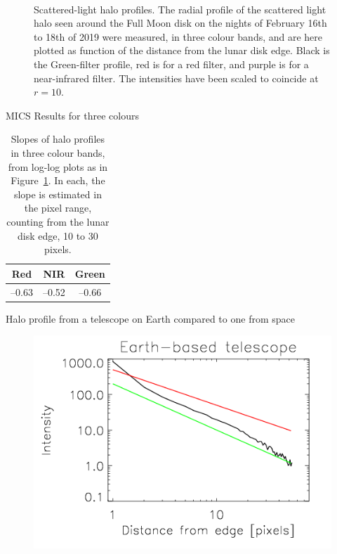 \documentclass[final,hyperref={pdfpagelabels=false}]{beamer}
\begin{document}
\begin{frame}[t]
\begin{columns}[t]
\begin{column}{.23\textwidth}
\begin{block}{}
\begin{figure}
\caption{Scattered-light halo profiles. The radial profile of the scattered light halo seen around the Full Moon disk on the nights of February 16th to 18th of 2019 were measured, in three colour bands, and are here plotted as function of the distance from the lunar disk edge. Black is the Green-filter profile, red is for a red filter, and purple is for a near-infrared filter. The intensities have been scaled to coincide at $r=10$.}~\label{fig:3panelfig}
\end{figure}
\end{block}

\begin{block}{MICS Results for three colours}
\begin{table}[]
    \centering
    \begin{tabular}{ccc}
    Red & NIR & Green \\
    \hline
         --0.63 & --0.52 & --0.66\\
         \hline
    \end{tabular}
    \caption{Slopes of halo profiles in three colour bands, from log-log plots as in Figure~\ref{fig:3panelfig}. In each, the slope is estimated in the pixel range, counting from the lunar disk edge, 10 to 30 pixels.}
    \label{tab:my_label}
\end{table}
\end{block}
\begin{block}{Halo profile from a telescope on Earth compared to one from space}
\begin{figure}
\centering 
\includegraphics[scale=.7]{fig/MLOprofile.png}

\end{figure}
\end{block}
\end{column}
\end{columns}
\end{frame}
\end{document}
